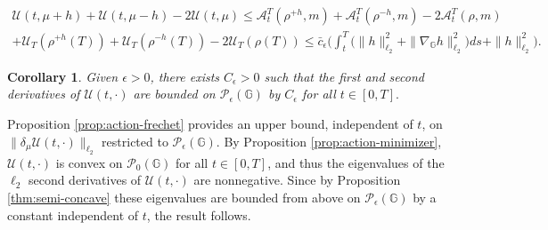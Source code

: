 \documentclass[10pt]{article}
\newtheorem{corollary}[theorem]{Corollary}
\numberwithin{equation}{section}
\newcommand{\cA}{ \mathcal{A}}
\newcommand{\cP}{ \mathcal{P}}
\newcommand{\cU}{ \mathcal{U}}
\newcommand{\bG}{\mathbb G}
\def\G{\mathbb{G}}
\begin{document}
\begin{multline*}
\cU(t, \mu+ h)+\cU(t, \mu- h) -2 \cU(t, \mu) \leq  \cA_t^{T}(\rho^{+h}, m)+\cA_t^{T}(\rho^{-h}, m) -2\cA_t^{T}(\rho, m)\\
 + \cU_T(\rho^{+h}(T))+\cU_T(\rho^{-h}(T)) -2\cU_T(\rho(T)) \leq  \bar c_{\epsilon}\bigg( \int_t^T \big(\|h\|^2_{\ell_2}+ \|\nabla_\bG h\|^2_{\ell_2}\big)ds +\|h\|^2_{\ell_2}\bigg).
\end{multline*}
\endproof
%
%
\begin{corollary}\label{cor:continuous} Given $\epsilon>0$, there exists $C_\epsilon>0$ such that the first and second derivatives of $\cU(t, \cdot)$ are bounded on $\cP_\epsilon(\G)$ by $C_\epsilon$ for all $t \in [0, T].$ 
\end{corollary}
%
\proof{} Proposition \ref{prop:action-frechet} provides an upper bound, independent of $t$, on $\|\delta_{\mu} \cU(t, \cdot)\|_{\ell_2}$ restricted to $\cP_\epsilon(\G)$. By Proposition \ref{prop:action-minimizer}, $\cU(t, \cdot)$ is convex on $\cP_0(\G)$ for all $t \in [0, T]$, and thus the eigenvalues of the $\ell_2$ second derivatives of $\cU(t, \cdot)$ are nonnegative. Since by Proposition \ref{thm:semi-concave} these eigenvalues are bounded from above on $\cP_\epsilon(\G)$ by a constant independent of $t$, the result follows. \endproof 


%
%
%
%
%
\end{document}
